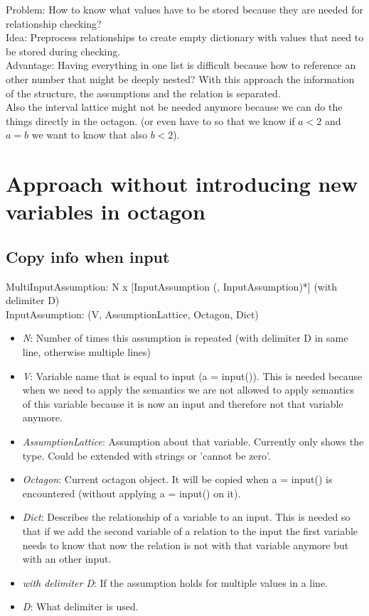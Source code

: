 \documentclass[11pt]{article}
\begin{document}
Problem: How to know what values have to be stored because they are needed for relationship checking?\\
Idea: Preprocess relationships to create empty dictionary with values that need to be stored during checking.\\

Advantage: Having everything in one list is difficult because how to reference an other number that might be deeply nested? With this approach the information of the structure, the assumptions and the relation is separated.\\
Also the interval lattice might not be needed anymore because we can do the things directly in the octagon. (or even have to so that we know if $a < 2$ and $a = b$ we want to know that also $b < 2$).

\section{Approach without introducing new variables in octagon}

\subsection{Copy info when input}

MultiInputAssumption: N x [InputAssumption (, InputAssumption)*] (with delimiter D)\\
InputAssumption: (V, AssumptionLattice, Octagon, Dict)
\begin{itemize}
  \item \textit{N}: Number of times this assumption is repeated (with delimiter D in same line, otherwise multiple lines)
  \item \textit{V}: Variable name that is equal to input (a = input()). This is needed because when we need to apply the semantics we are not allowed to apply semantics of this variable because it is now an input and therefore not that variable anymore.
  \item \textit{AssumptionLattice}: Assumption about that variable. Currently only shows the type. Could be extended with strings or 'cannot be zero'.
  \item \textit{Octagon}: Current octagon object. It will be copied when a = input() is encountered (without applying a = input() on it).
  \item \textit{Dict}: Describes the relationship of a variable to an input. This is needed so that if we add the second variable of a relation to the input the first variable needs to know that now the relation is not with that variable anymore but with an other input.
  \item \textit{with delimiter D}: If the assumption holds for multiple values in a line.
  \item \textit{D}: What delimiter is used.
\end{itemize}
\end{document}
